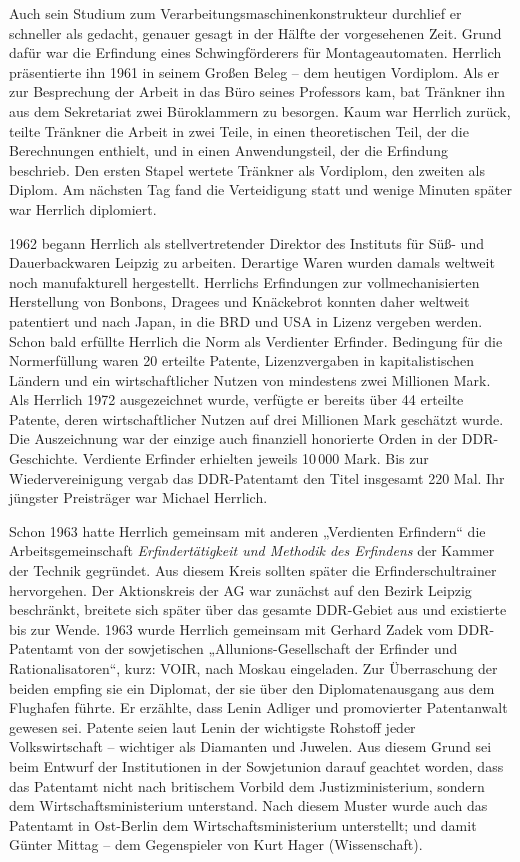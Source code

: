 \documentclass[11pt,a4paper]{article}
\begin{document}
Auch sein Studium zum Verarbeitungsmaschinenkonstrukteur durchlief er
schneller als gedacht, genauer gesagt in der Hälfte der vorgesehenen
Zeit. Grund dafür war die Erfindung eines Schwingförderers für
Montageautomaten. Herrlich präsentierte ihn 1961 in seinem Großen Beleg – dem
heutigen Vordiplom. Als er zur Besprechung der Arbeit in das Büro seines
Professors kam, bat Tränkner ihn aus dem Sekretariat zwei Büroklammern zu
besorgen. Kaum war Herrlich zurück, teilte Tränkner die Arbeit in zwei Teile,
in einen theoretischen Teil, der die Berechnungen enthielt, und in einen
Anwendungsteil, der die Erfindung beschrieb. Den ersten Stapel wertete
Tränkner als Vordiplom, den zweiten als Diplom. Am nächsten Tag fand die
Verteidigung statt und wenige Minuten später war Herrlich diplomiert.

1962 begann Herrlich als stellvertretender Direktor des Instituts für Süß- und
Dauerbackwaren Leipzig zu arbeiten. Derartige Waren wurden damals weltweit
noch manufakturell hergestellt. Herrlichs Erfindungen zur vollmechanisierten
Herstellung von Bonbons, Dragees und Knäckebrot konnten daher weltweit
patentiert und nach Japan, in die BRD und USA in Lizenz vergeben werden. Schon
bald erfüllte Herrlich die Norm als Verdienter Erfinder. Bedingung für die
Normerfüllung waren 20 erteilte Patente, Lizenzvergaben in kapitalistischen
Ländern und ein wirtschaftlicher Nutzen von mindestens zwei Millionen Mark.
Als Herrlich 1972 ausgezeichnet wurde, verfügte er bereits über 44 erteilte
Patente, deren wirtschaftlicher Nutzen auf drei Millionen Mark geschätzt
wurde. Die Auszeichnung war der einzige auch finanziell honorierte Orden in
der DDR-Geschichte. Verdiente Erfinder erhielten jeweils 10\,000 Mark. Bis zur
Wiedervereinigung vergab das DDR-Patentamt den Titel insgesamt 220 Mal. Ihr
jüngster Preisträger war Michael Herrlich.

Schon 1963 hatte Herrlich gemeinsam mit anderen „Verdienten Erfindern“ die
Arbeitsgemeinschaft \emph{Erfindertätigkeit und Methodik des Erfindens} der
Kammer der Technik gegründet. Aus diesem Kreis sollten später die
Erfinderschultrainer hervorgehen.  Der Aktionskreis der AG war zunächst auf
den Bezirk Leipzig beschränkt, breitete sich später über das gesamte
DDR-Gebiet aus und existierte bis zur Wende. 1963 wurde Herrlich gemeinsam mit
Gerhard Zadek vom DDR-Patentamt von der sowjetischen „Allunions-Gesellschaft
der Erfinder und Rationalisatoren“, kurz: VOIR, nach Moskau eingeladen. Zur
Überraschung der beiden empfing sie ein Diplomat, der sie über den
Diplomatenausgang aus dem Flughafen führte. Er erzählte, dass Lenin Adliger
und promovierter Patentanwalt gewesen sei. Patente seien laut Lenin der
wichtigste Rohstoff jeder Volkswirtschaft – wichtiger als Diamanten und
Juwelen. Aus diesem Grund sei beim Entwurf der Institutionen in der
Sowjetunion darauf geachtet worden, dass das Patentamt nicht nach britischem
Vorbild dem Justizministerium, sondern dem Wirtschaftsministerium unterstand.
Nach diesem Muster wurde auch das Patentamt in Ost-Berlin dem
Wirtschaftsministerium unterstellt; und damit Günter Mittag – dem Gegenspieler
von Kurt Hager (Wissenschaft).
\end{document}
